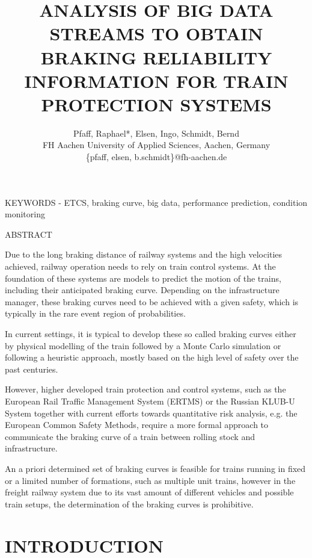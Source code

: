 \documentclass[a4paper, 12pt]{scrartcl}
\begin{document}
\title{\large \uppercase{Analysis of Big Data Streams to obtain Braking Reliability Information for Train Protection systems}}

\author{\normalsize	
	Pfaff, Raphael*, Elsen, Ingo, Schmidt, Bernd \\ \normalsize	
	FH Aachen University of Applied Sciences, Aachen, Germany \\
	\normalsize \{pfaff, elsen, b.schmidt\}@fh-aachen.de}
\date{}
\maketitle


KEYWORDS - ETCS, braking curve, big data, performance prediction, condition monitoring

ABSTRACT 

Due to the long braking distance of railway systems and the high velocities achieved, railway operation needs to rely on train control systems. At the foundation of these systems are models to predict the motion of the trains, including their anticipated braking curve. Depending on the infrastructure manager, these braking curves need to be achieved with a given safety, which is typically in the rare event region of probabilities.

In current settings, it is typical to develop these so called braking curves either by physical modelling of the train followed by a Monte Carlo simulation or following a heuristic approach, mostly based on the high level of safety over the past centuries.

However, higher developed train protection and control systems, such as the European Rail Traffic Management System (ERTMS) or the Russian KLUB-U System together with current efforts towards quantitative risk analysis, e.g. the European Common Safety Methods, require a more formal approach to communicate the braking curve of a train between rolling stock and infrastructure.

An a priori determined set of braking curves is feasible for trains running in fixed or a limited number of formations, such as multiple unit trains, however in the freight railway system due to its vast amount of different vehicles and possible train setups, the determination of the braking curves is prohibitive.


\section{\uppercase{Introduction}}
\end{document}
